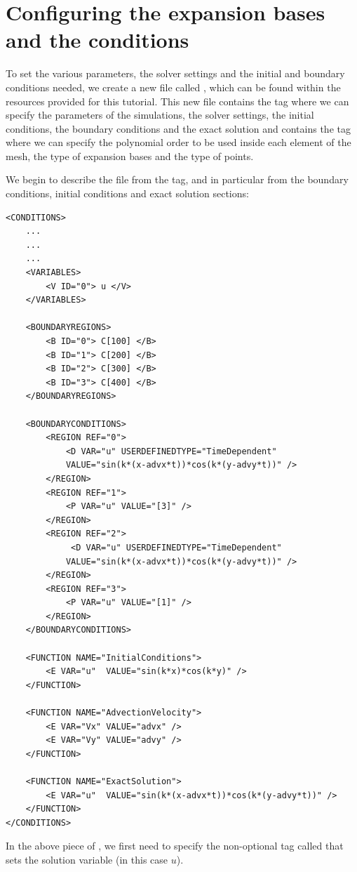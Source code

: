 \section{Configuring the expansion bases and the conditions}
\label{adr-configuring}
To set the various parameters, the solver settings and the initial and boundary 
conditions needed, we create a new file called , 
which can be found within the resources provided for this tutorial. 
This new file contains the  tag where we can specify 
the parameters of the simulations, the solver settings, the initial conditions, 
the boundary conditions and the exact solution and contains the  
tag where we can specify the polynomial order to be used inside each element 
of the mesh, the type of expansion bases and the type of points.

We begin to describe the  file from the  
tag, and in particular from the boundary conditions, initial conditions and exact solution 
sections:
%
\begin{lstlisting}[style=XMLStyle]
<CONDITIONS>
    ...
    ...
    ...
    <VARIABLES>
        <V ID="0"> u </V>
    </VARIABLES>
        
    <BOUNDARYREGIONS>
        <B ID="0"> C[100] </B>
        <B ID="1"> C[200] </B>
        <B ID="2"> C[300] </B>
        <B ID="3"> C[400] </B>
    </BOUNDARYREGIONS>
        
    <BOUNDARYCONDITIONS>
        <REGION REF="0">
            <D VAR="u" USERDEFINEDTYPE="TimeDependent"
            VALUE="sin(k*(x-advx*t))*cos(k*(y-advy*t))" />
        </REGION>
        <REGION REF="1">
            <P VAR="u" VALUE="[3]" />
        </REGION>
        <REGION REF="2">
             <D VAR="u" USERDEFINEDTYPE="TimeDependent"
            VALUE="sin(k*(x-advx*t))*cos(k*(y-advy*t))" />
        </REGION>
        <REGION REF="3">
            <P VAR="u" VALUE="[1]" />
        </REGION>
    </BOUNDARYCONDITIONS>
        
    <FUNCTION NAME="InitialConditions">
        <E VAR="u"  VALUE="sin(k*x)*cos(k*y)" />
    </FUNCTION>
    
    <FUNCTION NAME="AdvectionVelocity">
        <E VAR="Vx" VALUE="advx" />
        <E VAR="Vy" VALUE="advy" />
    </FUNCTION>
        
    <FUNCTION NAME="ExactSolution">
        <E VAR="u"  VALUE="sin(k*(x-advx*t))*cos(k*(y-advy*t))" />
    </FUNCTION>
</CONDITIONS>
\end{lstlisting}
%
In the above piece of , we first need to specify the non-optional tag 
called  that sets the solution variable (in this case $u$). 

